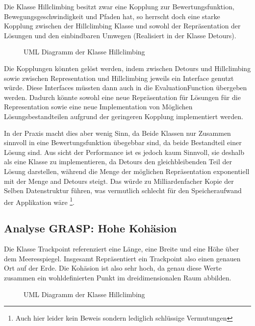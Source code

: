  Die Klasse Hillclimbing besitzt zwar eine Kopplung zur Bewertungsfunktion, Bewegungsgeschwindigkeit und Pfaden hat, so herrscht doch eine starke Kopplung zwischen der Hillclimbing Klasse und sowohl der Repräsentation der Lösungen und den einbindbaren Umwegen (Realisiert in der Klasse Detours).

\begin{figure}[H]
 \label{fig:GKBad}
  \centering
  
  \caption{UML Diagramm der Klasse Hillclimbing}
\end{figure}

Die Kopplungen könnten gelöst werden, indem zwischen Detours und Hillclimbing sowie zwischen Representation und Hillclimbing jeweils ein Interface genutzt würde. Diese Interfaces müssten dann auch in die EvaluationFunction übergeben werden. Dadurch könnte sowohl eine neue Repräsentation für Lösungen für die Representation sowie eine neue Implementation von Möglichen Lösungsbestandteilen aufgrund der geringeren Kopplung implementiert werden.

In der Praxis macht dies aber wenig Sinn, da Beide Klassen nur Zusammen sinnvoll in eine Bewertungsfunktion übegebbar sind, da beide Bestandteil einer Lösung sind. 
Aus sicht der Performance ist es jedoch kaum Sinnvoll, sie deshalb als eine Klasse zu implementieren, da Detours den gleichbleibenden Teil der Lösung darstellen, während die Menge der möglichen Repräsentation exponentiell mit der Menge and Detours steigt. 
Das würde zu Milliardenfacher Kopie der Selben Datenstruktur führen, was vermutlich schlecht für den Speicheraufwand der Applikation wäre \footnote{Auch hier leider kein Beweis sondern lediglich schlüssige Vermutungen}.


\subsection{Analyse GRASP: Hohe Kohäsion}

Die Klasse Trackpoint referenziert eine Länge, eine Breite und eine Höhe über dem Meeresspiegel. Insgesamt Repräsentiert ein Trackpoint also einen genauen Ort auf der Erde. Die Kohäsion ist also sehr hoch, da genau diese Werte zusammen ein wohldefinierten Punkt im dreidimensionalen Raum abbilden.


\begin{figure}[H]
 \label{fig:HighKohesion}
  \centering
  
  \caption{UML Diagramm der Klasse Hillclimbing}
\end{figure}


